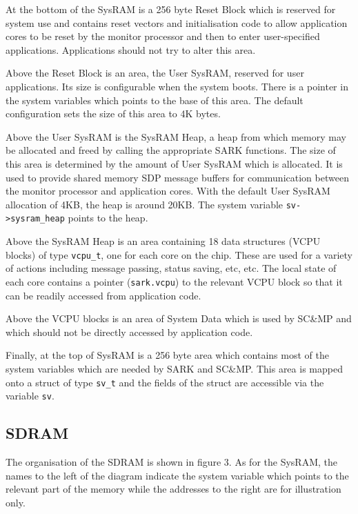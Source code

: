 
At the bottom of the SysRAM is a 256 byte Reset Block which is
reserved for system use and contains reset vectors and initialisation
code to allow application cores to be reset by the monitor processor
and then to enter user-specified applications. Applications should not
try to alter this area.

Above the Reset Block is an area, the User SysRAM, reserved for user
applications. Its size is configurable when the system boots. There is
a pointer in the system variables which points to the base of this
area. The default configuration sets the size of this area to 4K
bytes.

Above the User SysRAM is the SysRAM Heap, a heap from which memory may
be allocated and freed by calling the appropriate SARK functions. The
size of this area is determined by the amount of User SysRAM which is
allocated. It is used to provide shared memory SDP message buffers for
communication between the monitor processor and application cores.
With the default User SysRAM allocation of 4KB, the heap is around
20KB. The system variable \texttt{sv->sysram\_heap} points to the heap.

Above the SysRAM Heap is an area containing 18 data structures (VCPU
blocks) of type \texttt{vcpu\_t}, one for each core on the chip. These
are used for a variety of actions including message passing, status
saving, etc, etc. The local state of each core contains a pointer
(\texttt{sark.vcpu}) to the relevant VCPU block so that it can be
readily accessed from application code.

Above the VCPU blocks is an area of System Data which is used by
SC\&MP and which should not be directly accessed by application code.

Finally, at the top of SysRAM is a 256 byte area which contains most
of the system variables which are needed by SARK and SC\&MP. This area
is mapped onto a struct of type \texttt{sv\_t} and the fields of the
struct are accessible via the variable \texttt{sv}.

\subsection{SDRAM}

The organisation of the SDRAM is shown in figure 3. As for the SysRAM,
the names to the left of the diagram indicate the system variable
which points to the relevant part of the memory while the addresses to
the right are for illustration only.

